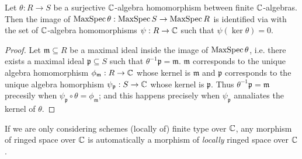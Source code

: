 \begin{lemma}\label{thm:maxspecop-alg-hom-annihilate}
   Let $\theta: R \to S$ be a surjective $\mathbb{C}$-algebra homomorphism between finite $\mathbb{C}$-algebras. Then the image of $\operatorname{MaxSpec}\theta : \operatorname{MaxSpec}{S} \to \operatorname{MaxSpec}{R}$ is identified via  with the set of $\mathbb{C}$-algebra homomorphisms $\psi : R \to \mathbb{C}$ such that $\psi(\ker\theta) = 0$.
\end{lemma}
\begin{proof}
  Let $\mathfrak{m} \subseteq R$ be a maximal ideal inside the image of $\operatorname{MaxSpec}\theta$, i.e. there exists a maximal ideal $\mathfrak{p} \subseteq S$ such that $\theta^{-1}\mathfrak{p}=\mathfrak{m}$. $\mathfrak{m}$ corresponds to the unique algebra homomorphism $\phi_{\mathfrak{m}} : R \to \mathbb{C}$ whose kernel is $\mathfrak{m}$ and $\mathfrak{p}$ corresponds to the unique algebra homorphism $\psi_{\mathfrak{p}} : S \to \mathbb{C}$ whose kernel is $\mathfrak{p}$. Thus $\theta^{-1}\mathfrak{p} = \mathfrak{m}$ precesily when $\psi_{\mathfrak{p}} \circ \theta = \phi_{\mathfrak{m}}$; and this happens precisely when $\psi_{\mathfrak{p}}$ annaliates the kernel of $\theta$.
\end{proof}

\begin{remark}
  If we are only considering schemes (locally of) finite type over $\mathbb{C}$, any morphism of ringed space over $\mathbb{C}$ is automatically a morphism of {\em locally\/} ringed space over $\mathbb{C}$.
\end{remark}

